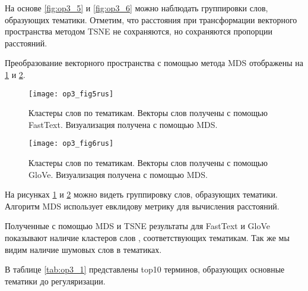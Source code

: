 На основе \ref{fig:op3_5} и \ref{fig:op3_6} можно наблюдать группировки слов, образующих тематики. Отметим, что расстояния при трансформации
векторного пространства методом TSNE не сохраняются, но сохраняются пропорции расстояний.

Преобразование векторного пространства с помощью метода MDS отображены  на \ref{fig:op3_7} и \ref{fig:op3_8}.

\begin{figure}[H]
  \caption{Кластеры слов по тематикам. Векторы слов получены с помощью FastText. Визуализация получена с помощью MDS.}
  \centering
    \texttt{[image: op3\_fig5rus]}
  \label{fig:op3_7}
\end{figure}

\begin{figure}[H]
  \caption{Кластеры слов по тематикам. Векторы слов получены с помощью GloVe. Визуализация получена с помощью MDS.}
  \centering
    \texttt{[image: op3\_fig6rus]}
  \label{fig:op3_8}
\end{figure}

На рисунках \ref{fig:op3_7} и \ref{fig:op3_8} можно видеть группировку слов, образующих тематики. 
Алгоритм MDS использует евклидову метрику для вычисления расстояний.

Полученные с помощью MDS и TSNE результаты для FastText и GloVe
показывают наличие кластеров слов , соответствующих тематикам. Так же мы
видим наличие шумовых слов в тематиках.

В таблице \ref{tab:op3_1}  представлены top10 терминов, образующих основные тематики до регуляризации.

